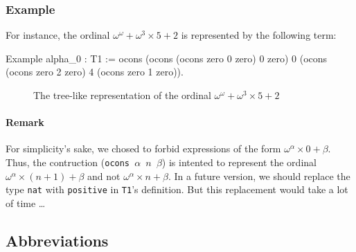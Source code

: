 \documentclass[a4paper]{book}
\begin{document}
\subsubsection{Example}

\label{alpha0-def}
For instance, the ordinal  $\omega^\omega+\omega^3\times 5+2$ is represented by the following term:

\begin{Coqsrc}
Example alpha_0 : T1 :=
  ocons (ocons (ocons zero 0 zero)
               0
               zero)
        0
       (ocons (ocons zero 2 zero)
              4
              (ocons zero 1 zero)).
\end{Coqsrc}


\begin{figure}[htb]
\centering
{}

\caption{The tree-like representation of the ordinal $\omega^\omega+\omega^3\times 5 +2$\label{fig:cnf-tree}}

\end{figure}



\paragraph{Remark}
For simplicity's sake, we chosed to forbid  expressions of the form $\omega^\alpha\times 0 + \beta$. Thus, the contruction (\texttt{ocons $\alpha$ $n$ $\beta$}) is intented to represent the
ordinal $\omega^\alpha\times(n+1)+\beta$ and not $\omega^\alpha\times n+\beta$.
In a future version, we should replace  the type \texttt{nat} with \texttt{positive} in \texttt{T1}'s 
definition. But this replacement would take a lot of time \dots{}

\subsection{Abbreviations}
\end{document}
